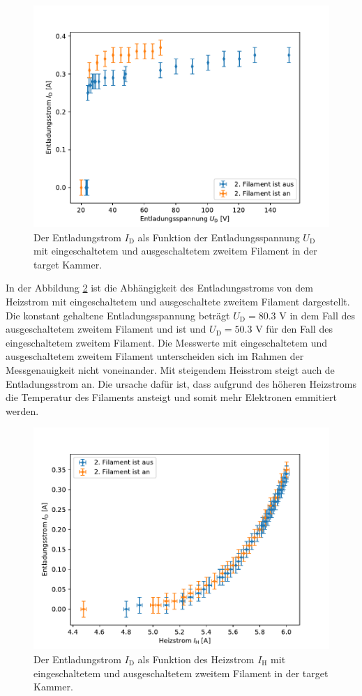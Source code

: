 \begin{figure}[H]
\centering
\includegraphics[scale=0.6]{3_1_Spannung.pdf}
\caption{Der Entladungstrom $I_{\mathrm{D}}$ als Funktion der Entladungsspannung $U_{\mathrm{D}}$   mit eingeschaltetem und ausgeschaltetem zweitem Filament in der target Kammer.}
\label{fig:3_1_Spannung}
\end{figure}
In der Abbildung \ref{fig:3_1_Strom} ist die Abhängigkeit des Entladungsstroms von dem Heizstrom mit eingeschaltetem und ausgeschaltete zweitem Filament dargestellt. Die konstant gehaltene Entladungsspannung beträgt $U_{\mathrm{D}}=80.3$ V in dem Fall des ausgeschaltetem zweitem Filament und  ist und $U_{\mathrm{D}}=50.3$ V für den Fall des eingeschaltetem zweitem Filament.   Die Messwerte mit eingeschaltetem und ausgeschaltetem zweitem Filament unterscheiden sich im Rahmen der Messgenauigkeit nicht voneinander. Mit steigendem Heisstrom steigt auch de Entladungsstrom an. Die ursache dafür ist, dass aufgrund des höheren Heizstroms die Temperatur des Filaments ansteigt und somit mehr Elektronen emmitiert werden. 
\begin{figure}[H]
\centering
\includegraphics[scale=0.6]{3_1_Strom.pdf}
\caption{Der Entladungstrom $I_{\mathrm{D}}$ als Funktion des Heizstrom $I_{\mathrm{H}}$  mit eingeschaltetem und ausgeschaltetem zweitem Filament in der target Kammer.}
\label{fig:3_1_Strom}
\end{figure}
